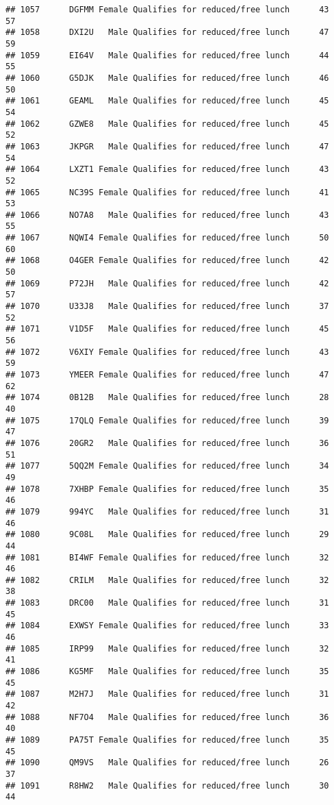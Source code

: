 \documentclass[
]{article}
\begin{document}
\begin{verbatim}
## 1057      DGFMM Female Qualifies for reduced/free lunch      43       57
## 1058      DXI2U   Male Qualifies for reduced/free lunch      47       59
## 1059      EI64V   Male Qualifies for reduced/free lunch      44       55
## 1060      G5DJK   Male Qualifies for reduced/free lunch      46       50
## 1061      GEAML   Male Qualifies for reduced/free lunch      45       54
## 1062      GZWE8   Male Qualifies for reduced/free lunch      45       52
## 1063      JKPGR   Male Qualifies for reduced/free lunch      47       54
## 1064      LXZT1 Female Qualifies for reduced/free lunch      43       52
## 1065      NC39S Female Qualifies for reduced/free lunch      41       53
## 1066      NO7A8   Male Qualifies for reduced/free lunch      43       55
## 1067      NQWI4 Female Qualifies for reduced/free lunch      50       60
## 1068      O4GER Female Qualifies for reduced/free lunch      42       50
## 1069      P72JH   Male Qualifies for reduced/free lunch      42       57
## 1070      U33J8   Male Qualifies for reduced/free lunch      37       52
## 1071      V1D5F   Male Qualifies for reduced/free lunch      45       56
## 1072      V6XIY Female Qualifies for reduced/free lunch      43       59
## 1073      YMEER Female Qualifies for reduced/free lunch      47       62
## 1074      0B12B   Male Qualifies for reduced/free lunch      28       40
## 1075      17QLQ Female Qualifies for reduced/free lunch      39       47
## 1076      20GR2   Male Qualifies for reduced/free lunch      36       51
## 1077      5QQ2M Female Qualifies for reduced/free lunch      34       49
## 1078      7XHBP Female Qualifies for reduced/free lunch      35       46
## 1079      994YC   Male Qualifies for reduced/free lunch      31       46
## 1080      9C08L   Male Qualifies for reduced/free lunch      29       44
## 1081      BI4WF Female Qualifies for reduced/free lunch      32       46
## 1082      CRILM   Male Qualifies for reduced/free lunch      32       38
## 1083      DRC00   Male Qualifies for reduced/free lunch      31       45
## 1084      EXWSY Female Qualifies for reduced/free lunch      33       46
## 1085      IRP99   Male Qualifies for reduced/free lunch      32       41
## 1086      KG5MF   Male Qualifies for reduced/free lunch      35       45
## 1087      M2H7J   Male Qualifies for reduced/free lunch      31       42
## 1088      NF7O4   Male Qualifies for reduced/free lunch      36       40
## 1089      PA75T Female Qualifies for reduced/free lunch      35       45
## 1090      QM9VS   Male Qualifies for reduced/free lunch      26       37
## 1091      R8HW2   Male Qualifies for reduced/free lunch      30       44

\end{verbatim}
\end{document}

